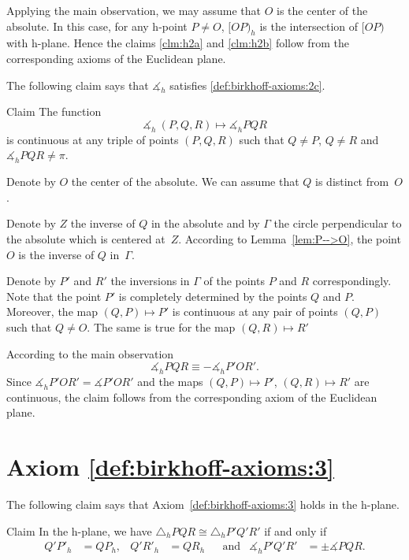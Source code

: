 Applying the main observation, 
we may assume that $O$ is the center of the absolute.
In this case, for any h-point $P\ne O$,
$[OP)_h$ is the intersection of $[OP)$ with h-plane.
Hence the claims \ref{clm:h2a} and \ref{clm:h2b} 
follow from the corresponding axioms of the Euclidean plane.
\qeds

The following claim says that
$\measuredangle_h$ satisfies
 \ref{def:birkhoff-axioms:2c}.

\begin{thm}{Claim}\label{clm:h2c}
The function 
$$\measuredangle_h\:(P,Q,R)\mapsto\measuredangle_h P Q R$$
is continuous at any triple of points $(P,Q,R)$
such that $Q\ne P$, $Q\ne R$ and $\measuredangle_h P Q R\ne\pi$.
\end{thm}

Denote by $O$ the center of the absolute.
We can assume that $Q$ is distinct from~$O$.

Denote by $Z$ the inverse of $Q$ in the absolute
and by $\Gamma$ the circle perpendicular to the absolute which is centered at~$Z$.
According to Lemma~\ref{lem:P-->O},
the point $O$ is the inverse of $Q$ in~$\Gamma$.

Denote by $P'$ and $R'$ the inversions in $\Gamma$ of the points $P$ and $R$ correspondingly.
Note that the point $P'$ is completely determined by the points $Q$ and $P$.
Moreover, the map $(Q,P)\mapsto P'$ is continuous at any pair of points $(Q,P)$ such that $Q\ne O$.
The same is true for the map $(Q,R)\mapsto R'$

According to the main observation 
$$\measuredangle_h P Q R\equiv -\measuredangle_h P' O R'.$$
Since $\measuredangle_h P' O R'=\measuredangle P' O R'$ and 
the maps $(Q,P)\mapsto P'$, $(Q,R)\mapsto R'$ are continuous,
the claim follows from the corresponding axiom of the Euclidean plane.
\qeds

\section*{Axiom \ref{def:birkhoff-axioms:3}}

The following claim says that Axiom~\ref{def:birkhoff-axioms:3} holds in the h-plane.

\begin{thm}{Claim}
In the h-plane, we have
$\triangle_h P Q R 
\cong
\triangle_h P' Q' R'$
if and only if 
\begin{align*}
Q' P'_h&=Q P_h, & Q' R'_h&= Q R_h &&\text{and}
&\measuredangle_h P' Q' R'&=\pm\measuredangle P Q R.
\end{align*}
 
\end{thm}

